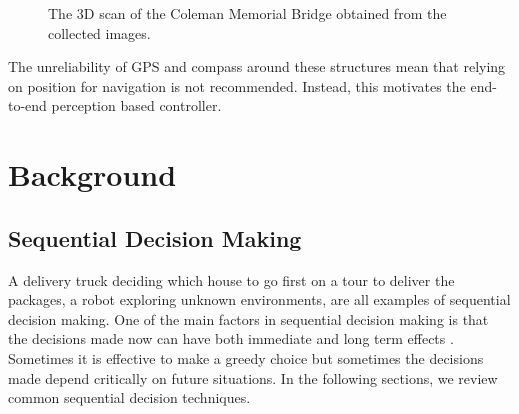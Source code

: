 \documentclass[12pt]{report}
\begin{document}
\begin{figure}[htp]
	\centering 
	\caption{The 3D scan of the Coleman Memorial Bridge obtained from the collected images.}
   \label{fig:3d}
\end{figure}



The unreliability of GPS and compass around these structures mean that relying on position for navigation is not recommended. Instead, this motivates the end-to-end perception based controller.



\chapter{Background} %

\label{background} %

\section{Sequential Decision Making}
\label{sequential_decision_making}
A delivery truck deciding which house to go first on a tour to deliver the packages, a robot exploring unknown environments, are all examples of sequential decision making. One of the main factors in sequential decision making is that the decisions made now can have both immediate and long term effects \cite{littman1996algorithms}. Sometimes it is effective to make a greedy choice but sometimes the decisions made depend critically on future situations. In the following sections, we review common sequential decision techniques.
\end{document}
